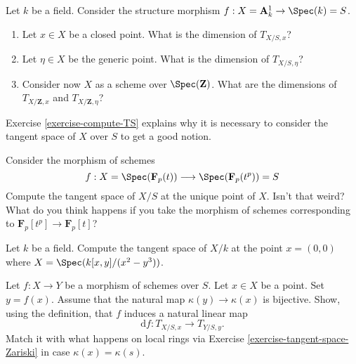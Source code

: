 \begin{exercise}
\label{exercise-compute-TS}
Let $k$ be a field. Consider
the structure morphism $f : X = \mathbf{A}^1_k \to \Spec(k) = S$.
\begin{enumerate}
\item Let $x \in X$ be a closed point. What is the dimension of
$T_{X/S, x}$?
\item Let $\eta \in X$ be the generic point. What is the dimension
of $T_{X/S, \eta}$?
\item Consider now $X$ as a scheme over $\Spec(\mathbf{Z})$.
What are the dimensions of $T_{X/\mathbf{Z}, x}$ and
$T_{X/\mathbf{Z}, \eta}$?
\end{enumerate}
\end{exercise}

\begin{remark}
\label{remark-tangent-space-relative}
Exercise \ref{exercise-compute-TS} explains why it is necessary
to consider the tangent space of $X$ over $S$ to get a good notion.
\end{remark}

\begin{exercise}
\label{exercise-compute-TS-field}
Consider the morphism of schemes
$$
f : X = \Spec(\mathbf{F}_p(t))
\longrightarrow
\Spec(\mathbf{F}_p(t^p)) = S
$$
Compute the tangent space of $X/S$ at the unique point of $X$.
Isn't that weird? What do you think happens if you take the morphism
of schemes corresponding to $\mathbf{F}_p[t^p] \to \mathbf{F}_p[t]$?
\end{exercise}

\begin{exercise}
\label{exercise-compute-TS-cusp}
Let $k$ be a field.
Compute the tangent space of $X/k$ at the point $x = (0, 0)$
where $X = \Spec(k[x, y]/(x^2 - y^3))$.
\end{exercise}

\begin{exercise}
\label{exercise-map-tangent-spaces}
Let $f : X \to Y$ be a morphism of schemes over $S$.
Let $x \in X$ be a point. Set $y = f(x)$.
Assume that the natural map $\kappa(y) \to \kappa(x)$ is
bijective. Show, using the definition,
that $f$ induces a natural linear map
$$
\text{d}f : T_{X/S, x} \longrightarrow T_{Y/S, y}.
$$
Match it with what happens on local rings via
Exercise \ref{exercise-tangent-space-Zariski} in case $\kappa(x) = \kappa(s)$.
\end{exercise}

